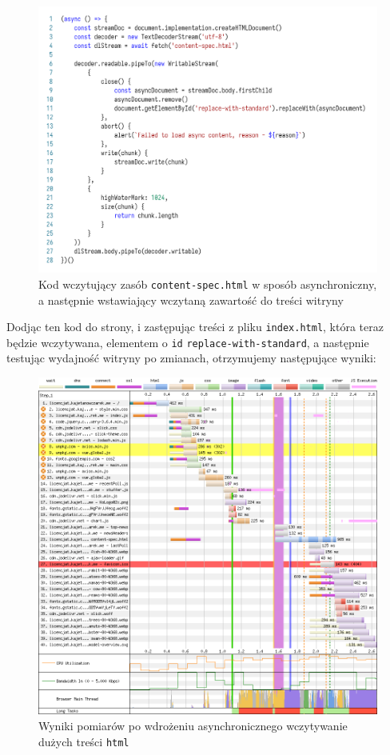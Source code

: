 \documentclass[licencjacka]{pracadypl}
\begin{document}
\begin{figure}[H]
  \centering
  \includegraphics[width=\linewidth]{images/code-js-async-streaming.png}
  \caption{Kod wczytujący zasób \texttt{content-spec.html} w sposób asynchroniczny, a następnie wstawiający wczytaną zawartość do treści witryny}
  \label{fig:code-js-async-streaming}
\end{figure}

Dodjąc ten kod do strony, i zastępując treści z pliku \texttt{index.html}, która teraz będzie wczytywana, elementem o \texttt{id} \texttt{replace-with-standard}, a następnie testując wydajność witryny po zmianach, otrzymujemy następujące wyniki:

\begin{figure}[H]
  \centering
  \includegraphics[width=\linewidth]{images/waterfall-after-async-html.png}
  \caption{Wyniki pomiarów po wdrożeniu asynchronicznego wczytywanie dużych treści \texttt{html}}
  \label{fig:waterfall-after-async-html}
\end{figure}
\end{document}

